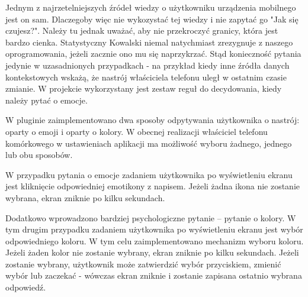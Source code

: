 Jednym z najrzetelniejszych źródeł wiedzy o użytkowniku urządzenia mobilnego jest on sam. Dlaczegoby więc nie wykozystać tej wiedzy i nie zapytać go "Jak się czujesz?". Należy tu jednak uważać, aby nie przekroczyć granicy, która jest bardzo cienka. Statystyczny Kowalski niemal natychmiast zrezygnuje z naszego oprogramowania, jeżeli zacznie ono mu się naprzykrzać. Stąd konieczność pytania jedynie w uzasadnionych przypadkach - na przykład kiedy inne źródła danych kontekstowych wskażą, że nastrój właściciela telefonu uległ w ostatnim czasie zmianie. W projekcie wykorzystany jest zestaw reguł do decydowania, kiedy należy pytać o emocje.

W pluginie zaimplementowano dwa sposoby odpytywania użytkownika o nastrój: oparty o emoji i oparty o kolory. W obecnej realizacji właściciel telefonu komórkowego w ustawieniach aplikacji ma możliwość wyboru żadnego, jednego lub obu sposobów.

W przypadku pytania o emocje zadaniem użytkownika po wyświetleniu ekranu jest kliknięcie odpowiedniej emotikony z napisem. Jeżeli żadna ikona nie zostanie wybrana, ekran zniknie po kilku sekundach.

Dodatkowo wprowadzono bardziej psychologiczne pytanie -- pytanie o kolory. W tym drugim przypadku zadaniem użytkownika po wyświetleniu ekranu jest wybór odpowiedniego koloru. W tym celu zaimplementowano mechanizm wyboru koloru. Jeżeli żaden kolor nie zostanie wybrany, ekran zniknie po kilku sekundach. Jeżeli zostanie wybrany, użytkownik może zatwierdzić wybór przyciskiem, zmienić wybór lub zaczekać - wówczas ekran zniknie i zostanie zapisana ostatnio wybrana odpowiedź.

